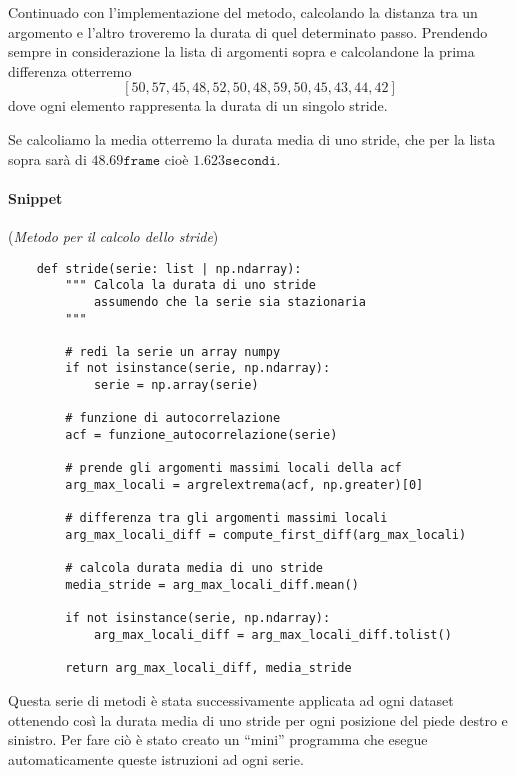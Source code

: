 Continuado con l'implementazione del metodo, calcolando la distanza tra un argomento e l'altro troveremo
la durata di quel determinato passo. Prendendo sempre in considerazione la lista di argomenti sopra
e calcolandone la prima differenza otterremo
\[[50, 57, 45, 48, 52, 50, 48, 59, 50, 45, 43, 44, 42]\]
dove ogni elemento rappresenta la durata di un singolo stride.

Se calcoliamo la media otterremo la durata media di uno stride, che per la lista sopra sarà di 
$48.69\texttt{frame}$ cioè $1.623\texttt{secondi}$.


\paragraph{Snippet} (\textit{Metodo per il calcolo dello stride})
\begin{verbatim}
    def stride(serie: list | np.ndarray):
        """ Calcola la durata di uno stride
            assumendo che la serie sia stazionaria    
        """

        # redi la serie un array numpy
        if not isinstance(serie, np.ndarray):
            serie = np.array(serie)
        
        # funzione di autocorrelazione
        acf = funzione_autocorrelazione(serie)

        # prende gli argomenti massimi locali della acf
        arg_max_locali = argrelextrema(acf, np.greater)[0]

        # differenza tra gli argomenti massimi locali
        arg_max_locali_diff = compute_first_diff(arg_max_locali)

        # calcola durata media di uno stride
        media_stride = arg_max_locali_diff.mean()

        if not isinstance(serie, np.ndarray):
            arg_max_locali_diff = arg_max_locali_diff.tolist()

        return arg_max_locali_diff, media_stride

\end{verbatim}


Questa serie di metodi è stata successivamente applicata ad ogni dataset ottenendo così la durata
media di uno stride per ogni posizione del piede destro e sinistro. Per fare ciò è stato creato
un ``mini'' programma che esegue automaticamente queste istruzioni ad ogni serie.

